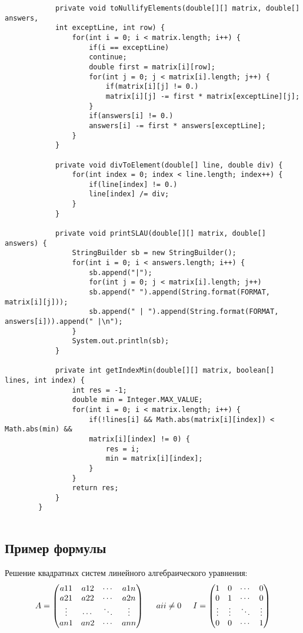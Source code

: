 \documentclass[12pt,a4paper]{scrartcl}
\begin{document}
\begin{verbatim}
	    	private void toNullifyElements(double[][] matrix, double[] answers,
	    	int exceptLine, int row) {
	    		for(int i = 0; i < matrix.length; i++) {
	    			if(i == exceptLine)
	    			continue;
	    			double first = matrix[i][row];
	    			for(int j = 0; j < matrix[i].length; j++) {
	    				if(matrix[i][j] != 0.)
	    				matrix[i][j] -= first * matrix[exceptLine][j];
	    			}
	    			if(answers[i] != 0.)
	    			answers[i] -= first * answers[exceptLine];
	    		}
	    	}
	    	
	    	private void divToElement(double[] line, double div) {
	    		for(int index = 0; index < line.length; index++) {
	    			if(line[index] != 0.)
	    			line[index] /= div;
	    		}
	    	}
	    	
	    	private void printSLAU(double[][] matrix, double[] answers) {
	    		StringBuilder sb = new StringBuilder();
	    		for(int i = 0; i < answers.length; i++) {
	    			sb.append("|");
	    			for(int j = 0; j < matrix[i].length; j++)
	    			sb.append(" ").append(String.format(FORMAT, matrix[i][j]));
	    			sb.append(" | ").append(String.format(FORMAT, answers[i])).append(" |\n");
	    		}
	    		System.out.println(sb);
	    	}
	    	
	    	private int getIndexMin(double[][] matrix, boolean[] lines, int index) {
	    		int res = -1;
	    		double min = Integer.MAX_VALUE;
	    		for(int i = 0; i < matrix.length; i++) {
	    			if(!lines[i] && Math.abs(matrix[i][index]) < Math.abs(min) &&
	    			matrix[i][index] != 0) {
	    				res = i;
	    				min = matrix[i][index];
	    			}
	    		}
	    		return res;
	    	}
	    }
	    
	\end{verbatim}
	
	\subsection{Пример формулы}
	\label{sec:mathexample}
	
	Решение квадратных систем линейного алгебраического уравнения:
	\begin{equation}\label{eq:solv}
		A=\begin{pmatrix}
			a11 & a12 & \cdots  & a1n \\
			a21 & a22 & \cdots  & a2n \\
			\vdots  & \cdots  & \ddots  & \vdots  \\
			an1 & an2 & \cdots & ann 
		\end{pmatrix}
	    \hspace{0.5cm}
	    aii\neq 0
	    \hspace{0.5cm}
	    I=\begin{pmatrix}
	    	1 & 0 & \cdots & 0 \\
	    	0 & 1 & \cdots & 0 \\
	    	\vdots & \vdots & \ddots & \vdots \\
	    	0 & 0 & \cdots & 1
	    \end{pmatrix}
	\end{equation}
	
\end{document}
